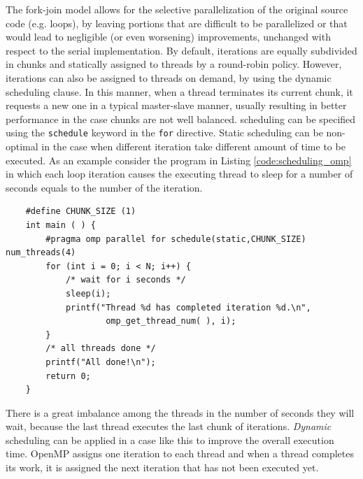     The fork-join model allows for the selective parallelization of
    the original source code (e.g. loops), by leaving portions that
    are difficult to be parallelized or that would lead to negligible
    (or even worsening) improvements, unchanged with respect to the
    serial implementation. By default, iterations are equally
    subdivided in chunks and statically assigned to threads by a
    round-robin policy. However, iterations can also be assigned to
    threads on demand, by using the dynamic scheduling clause. In this
    manner, when a thread terminates its current chunk, it requests a
    new one in a typical master-slave manner, usually resulting in
    better performance in the case chunks are not well balanced.
    scheduling can be specified using the \texttt{schedule} keyword in the \texttt{for} directive.
    Static scheduling can be non-optimal in the case when different iteration take different amount of time to be executed. As an example consider the program in Listing \ref{code:scheduling_omp} in which each loop iteration causes the executing thread to sleep for a number of seconds equals to the number of the iteration. 
    
    \begin{lstlisting}
    #define CHUNK_SIZE (1)
    int main ( ) {
    	#pragma omp parallel for schedule(static,CHUNK_SIZE) num_threads(4)
    	for (int i = 0; i < N; i++) {
    		/* wait for i seconds */
    		sleep(i);    		
    		printf("Thread %d has completed iteration %d.\n", 
    				omp_get_thread_num( ), i);
    	}
    	/* all threads done */
    	printf("All done!\n");
    	return 0;
    }
\end{lstlisting}

There is a great imbalance among the threads in the number of seconds they will wait, because the last thread executes the last chunk of iterations.
\textit{Dynamic} scheduling can be applied in a case like this to improve the overall execution time. OpenMP assigns one iteration to each thread and when a thread completes its work, it is assigned the next iteration that has not been executed yet. 

